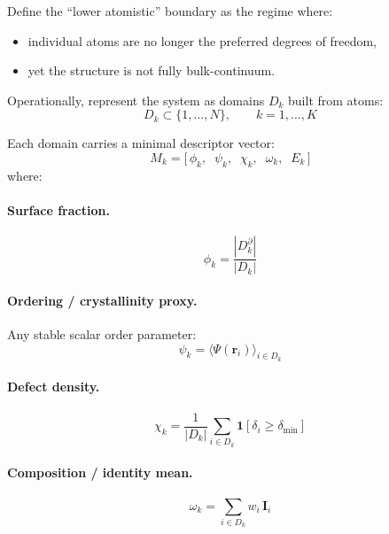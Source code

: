 \documentclass[11pt, a4paper, oneside]{article}
\theoremstyle{definition}
\theoremstyle{remark}
\newcommand{\boldI}{\mathbf{I}}
\begin{document}
Define the ``lower atomistic'' boundary as the regime where:
\begin{itemize}
  \item individual atoms are no longer the preferred degrees of
        freedom,
  \item yet the structure is not fully bulk-continuum.
\end{itemize}

Operationally, represent the system as domains $D_k$ built from
atoms:
\[
  D_k \subset \{1,\ldots,N\}, \qquad k = 1,\ldots,K
\]

Each domain carries a minimal descriptor vector:
\begin{equation}
  M_k =
  \bigl[\,
    \phi_k,\;\;
    \psi_k,\;\;
    \chi_k,\;\;
    \omega_k,\;\;
    E_k
  \,\bigr]
  \label{eq:atomistic-descriptor}
\end{equation}
where:

\paragraph{Surface fraction.}
\begin{equation}
  \phi_k = \frac{|D_k^{\partial}|}{|D_k|}
  \label{eq:surface-fraction}
\end{equation}

\paragraph{Ordering / crystallinity proxy.}
Any stable scalar order parameter:
\begin{equation}
  \psi_k = \langle \Psi(\mathbf{r}_i) \rangle_{i \in D_k}
  \label{eq:ordering}
\end{equation}

\paragraph{Defect density.}
\begin{equation}
  \chi_k = \frac{1}{|D_k|}
  \sum_{i \in D_k}
  \mathbf{1}[\delta_i \geq \delta_{\min}]
  \label{eq:defect-density}
\end{equation}

\paragraph{Composition / identity mean.}
\begin{equation}
  \omega_k = \sum_{i \in D_k} w_i\, \boldI_i
  \label{eq:comp-mean}
\end{equation}
\end{document}
